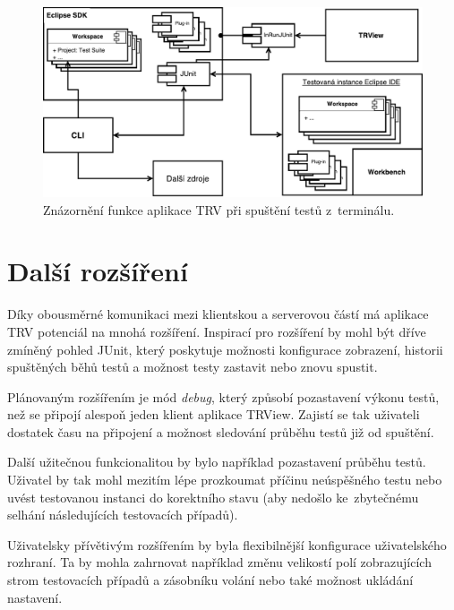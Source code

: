     \begin{figure}
	\includegraphics[width=\textwidth, center]{obrazky-figures/TRV_run_from_cli.pdf}
	\caption{Znázornění funkce aplikace TRV při spuštění testů z~terminálu.}
	\label{fig:TRV_run_from_term}
      \end{figure}

  \section{Další rozšíření}
  Díky obousměrné komunikaci mezi klientskou a serverovou částí má aplikace TRV potenciál na mnohá rozšíření. Inspirací pro rozšíření by mohl být dříve zmíněný pohled JUnit, který poskytuje možnosti konfigurace zobrazení, historii spuštěných běhů testů a možnost testy zastavit nebo znovu spustit.

  Plánovaným rozšířením je mód \emph{debug}, který způsobí pozastavení výkonu testů, než se připojí alespoň jeden klient aplikace TRView. Zajistí se tak uživateli dostatek času na připojení a možnost sledování průběhu testů již od spuštění.

  Další užitečnou funkcionalitou by bylo například pozastavení průběhu testů. Uživatel by tak mohl mezitím lépe prozkoumat příčinu neúspěšného testu nebo uvést testovanou instanci do korektního stavu (aby nedošlo ke~zbytečnému selhání následujících testovacích případů).

  Uživatelsky přívětivým rozšířením by byla flexibilnější konfigurace uživatelského rozhraní. Ta by mohla zahrnovat například změnu velikostí polí zobrazujících strom testovacích případů a zásobníku volání nebo také možnost ukládání nastavení.
